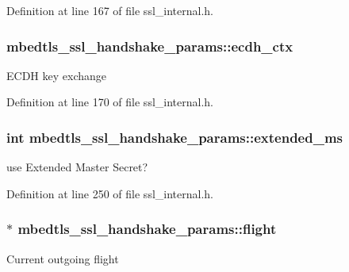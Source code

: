 Definition at line 167 of file ssl\-\_\-internal.\-h.

\hypertarget{structmbedtls__ssl__handshake__params_ac817564988b758dfa0d6829f78817712}{
\subsubsection[{ecdh\-\_\-ctx}]{ mbedtls\-\_\-ssl\-\_\-handshake\-\_\-params\-::ecdh\-\_\-ctx}}\label{structmbedtls__ssl__handshake__params_ac817564988b758dfa0d6829f78817712}
E\-C\-D\-H key exchange 

Definition at line 170 of file ssl\-\_\-internal.\-h.

\hypertarget{structmbedtls__ssl__handshake__params_ad230c6beea9b3ec7a5d6eb072c80e3db}{
\subsubsection[{extended\-\_\-ms}]{\setlength{\rightskip}{0pt plus 5cm}int mbedtls\-\_\-ssl\-\_\-handshake\-\_\-params\-::extended\-\_\-ms}}\label{structmbedtls__ssl__handshake__params_ad230c6beea9b3ec7a5d6eb072c80e3db}
use Extended Master Secret? 

Definition at line 250 of file ssl\-\_\-internal.\-h.

\hypertarget{structmbedtls__ssl__handshake__params_a2c8fb6344a9fb81db52b5add59baf95b}{
\subsubsection[{flight}]{$\ast$ mbedtls\-\_\-ssl\-\_\-handshake\-\_\-params\-::flight}}\label{structmbedtls__ssl__handshake__params_a2c8fb6344a9fb81db52b5add59baf95b}
Current outgoing flight 

